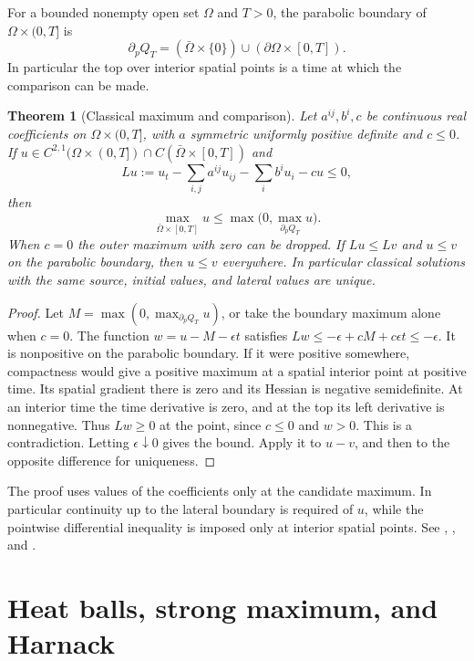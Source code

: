 \documentclass[11pt,oneside,openany]{book}
\theoremstyle{plain}
\newtheorem{theorem}{Theorem}[chapter]
\theoremstyle{definition}
\theoremstyle{remark}
\begin{document}
For a bounded nonempty open set \(\Omega\) and \(T>0\), the parabolic
boundary of \(\Omega\times(0,T]\) is
\[
 \partial_p Q_T=(\bar\Omega\times\{0\})
                 \cup(\partial\Omega\times[0,T]).
\]
In particular the top over interior spatial points is a time at
which the comparison can be made.

\begin{theorem}[Classical maximum and comparison]
\label{pde:heat-classical-maximum}
Let \(a^{ij},b^i,c\) be continuous real coefficients on
\(\Omega\times(0,T]\), with \(a\) symmetric uniformly positive
definite and \(c\leq0\). If
\(u\in C^{2,1}(\Omega\times(0,T])\cap C(\bar\Omega\times[0,T])\) and
\[
 Lu:=u_t-\sum_{i,j}a^{ij}u_{ij}-\sum_i b^i u_i-cu\leq0 ,
\]
then
\[
 \max_{\bar\Omega\times[0,T]}u
     \leq \max\bigl(0,\max_{\partial_p Q_T}u\bigr).
\]
When \(c=0\) the outer maximum with zero can be dropped.
If \(Lu\leq Lv\) and \(u\leq v\) on the parabolic boundary, then
\(u\leq v\) everywhere. In particular classical solutions with
the same source, initial values, and lateral values are unique.
\end{theorem}

\begin{proof}
Let \(M=\max(0,\max_{\partial_p Q_T}u)\), or take the boundary
maximum alone when \(c=0\). The function \(w=u-M-\epsilon t\)
satisfies \(Lw\leq -\epsilon+cM+c\epsilon t\leq-\epsilon\).
It is nonpositive on the parabolic boundary. If it were positive
somewhere, compactness would give a positive maximum at a spatial
interior point at positive time. Its spatial gradient there is
zero and its Hessian is negative semidefinite. At an interior
time the time derivative is zero, and at the top its left
derivative is nonnegative. Thus \(Lw\geq0\) at the point, since
\(c\leq0\) and \(w>0\). This is a contradiction. Letting
\(\epsilon\downarrow0\) gives the bound. Apply it to \(u-v\),
and then to the opposite difference for uniqueness.
\end{proof}

The proof uses values of the coefficients only at the candidate
maximum. In particular continuity up to the lateral boundary is
required of \(u\), while the pointwise differential inequality is
imposed only at interior spatial points. See
\cite[\S 7.1.4]{Evans}, \cite[\S 4.4]{RR}, and
\cite[Chapter II, \S 1]{Lieberman}.

\section{Heat balls, strong maximum, and Harnack}
\label{pde:H04}
\end{document}
